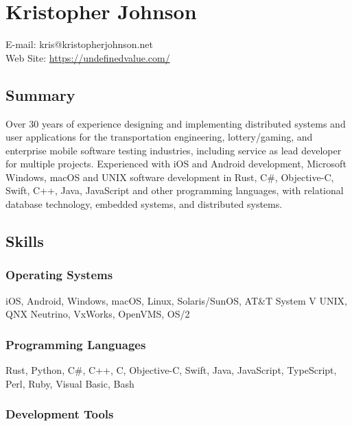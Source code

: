 \hypertarget{kristopher-johnson}{%
\section{Kristopher Johnson}\label{kristopher-johnson}}

E-mail: kris@kristopherjohnson.net\\
Web Site: \url{https://undefinedvalue.com/}

\hypertarget{summary}{%
\subsection{Summary}\label{summary}}

Over 30 years of experience designing and implementing distributed
systems and user applications for the transportation engineering,
lottery/gaming, and enterprise mobile software testing industries,
including service as lead developer for multiple projects. Experienced
with iOS and Android development, Microsoft Windows, macOS and UNIX
software development in Rust, C\#, Objective-C, Swift, C++, Java,
JavaScript and other programming languages, with relational database
technology, embedded systems, and distributed systems.

\hypertarget{skills}{%
\subsection{Skills}\label{skills}}

\hypertarget{operating-systems}{%
\subsubsection{Operating Systems}\label{operating-systems}}

iOS, Android, Windows, macOS, Linux, Solaris/SunOS, AT\&T System V UNIX,
QNX Neutrino, VxWorks, OpenVMS, OS/2

\hypertarget{programming-languages}{%
\subsubsection{Programming Languages}\label{programming-languages}}

Rust, Python, C\#, C++, C, Objective-C, Swift, Java, JavaScript,
TypeScript, Perl, Ruby, Visual Basic, Bash

\hypertarget{development-tools}{%
\subsubsection{Development Tools}\label{development-tools}}

